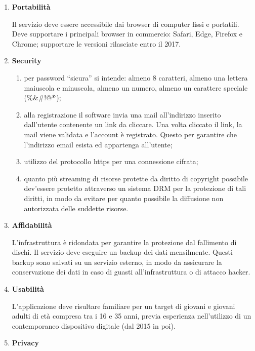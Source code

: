 \documentclass[a4paper,12pt]{article}
\begin{document}
\begin{enumerate}[label=\textbf{RNF\arabic*}\;, ref=\textbf{RNF\arabic*}]
    \item \label{itm:rnf1} \textbf{Portabilità}
    
    Il servizio deve essere accessibile dai browser di computer fissi e portatili. Deve supportare i principali browser in commercio: Safari, Edge, Firefox e Chrome; supportare le versioni rilasciate entro il 2017.
    \item \label{itm:rnf2} \textbf{Security}
    
    \begin{enumerate}[label=\textbf{\alph*}, ref=\textbf{RNF2\alph*}, itemsep=0.5em]
        \item \label{itm:rnf2a} per password “sicura” si intende: almeno 8 caratteri, almeno una lettera maiuscola e minuscola, almeno un numero, almeno un carattere speciale (\%\&\#!@*\^\,);
        \item \label{itm:rnf2b} alla registrazione il software invia una mail all’indirizzo inserito dall’utente contenente un link da cliccare. Una volta cliccato il link, la mail viene validata e l’account è registrato. Questo per garantire che l’indirizzo email esista ed appartenga all’utente;
        \item \label{itm:rnf2c} utilizzo del protocollo https per una connessione cifrata;
        \item \label{itm:rnf2d} quanto più streaming di risorse protette da diritto di copyright possibile dev’essere protetto attraverso un sistema DRM per la protezione di tali diritti, in modo da evitare per quanto possibile la diffusione non autorizzata delle suddette risorse.
    \end{enumerate}

    \item \label{itm:rnf3} \textbf{Affidabilità}
    
    L’infrastruttura è ridondata per garantire la protezione dal fallimento di dischi. Il servizio deve eseguire un backup dei dati mensilmente. Questi backup sono salvati su un servizio esterno, in modo da assicurare la conservazione dei dati in caso di guasti all’infrastruttura o di attacco hacker.
    \item \label{itm:rnf4} \textbf{Usabilità}
    
    L’applicazione deve risultare familiare per un target di giovani e giovani adulti di età compresa tra i 16 e 35 anni, previa esperienza nell’utilizzo di un contemporaneo dispositivo digitale (dal 2015 in poi).
    \item \label{itm:rnf5} \textbf{Privacy}
    

\end{enumerate}
\end{document}
